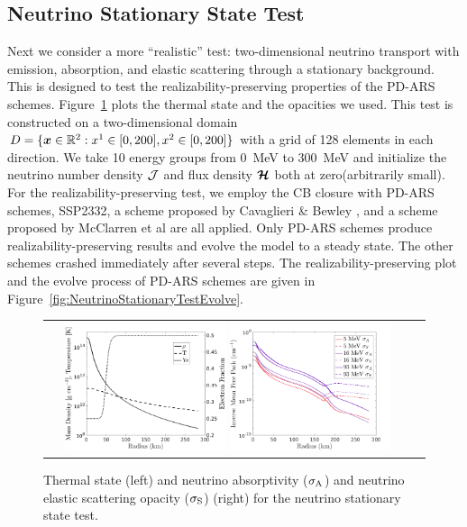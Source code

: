 \subsection{Neutrino Stationary State Test} \label{se: Neutrino Stationary State Test}
Next we consider a more ``realistic'' test: two-dimensional neutrino transport with emission, absorption, and elastic scattering through a stationary background.
This is designed to test the realizability-preserving properties of the PD-ARS schemes.
Figure~\ref{fig:NeutrinoStationaryTestEOS} plots the thermal state and the opacities we used.
This test is constructed on a two-dimensional domain $D=\{\boldsymbol{x}\in\mathbb{R}^{2}:x^{1}\in[0,200], x^{2}\in[0,200]\}$ with a grid of 128 elements in each direction.
We take 10 energy groups from 0~MeV to 300~MeV and initialize the neutrino number density $\mathcal{J}$ and flux density $\boldsymbol{\mathcal{H}}$ both at zero(arbitrarily small).
For the realizability-preserving test, we employ the CB closure with PD-ARS schemes, SSP2332, a scheme proposed by Cavaglieri \& Bewley \cite{cavaglieriBewley2015}, and a scheme proposed by McClarren et al \cite{mcclarren_etal_2008} are all applied.
Only PD-ARS schemes produce realizability-preserving results and evolve the model to a steady state.
The other schemes crashed immediately after several steps.
The realizability-preserving plot and the evolve process of PD-ARS schemes are given in Figure~\ref{fig:NeutrinoStationaryTestEvolve}. 

\begin{figure}[h]
  \centering
  \begin{tabular}{cc}
    \includegraphics[width=0.45\textwidth]{figures/NStatinaryS_EOS}
    \includegraphics[width=0.45\textwidth]{figures/NSS_Opacities}
  \end{tabular}
   \caption{Thermal state (left) and neutrino absorptivity ($\sigma_{{\rm A}}$) and neutrino elastic scattering opacity ($ \sigma_{{\rm S}}$) (right) for the neutrino stationary state test.}
   \label{fig:NeutrinoStationaryTestEOS}
\end{figure}

